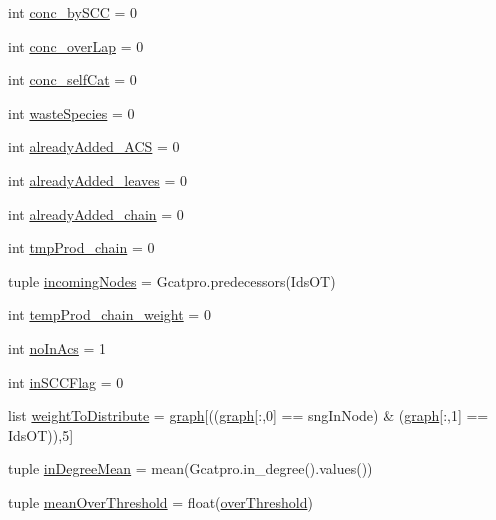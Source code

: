 \begin{DoxyCompactItemize}
int \hyperlink{a00102_aac2f508d526d62bd7f9d4f5a5f8b1821}{conc\-\_\-by\-S\-C\-C} = 0
\item 
int \hyperlink{a00102_afd3169174539244248b78c8da2bba265}{conc\-\_\-over\-Lap} = 0
\item 
int \hyperlink{a00102_a9e8cc07f7d7f892f3f72274318dcbcef}{conc\-\_\-self\-Cat} = 0
\item 
int \hyperlink{a00102_ace0de61f3c6aa14b4197156be3a68280}{waste\-Species} = 0
\item 
int \hyperlink{a00102_a38f20e6b1cad6a61f1c9b87b37c76f63}{already\-Added\-\_\-\-A\-C\-S} = 0
\item 
int \hyperlink{a00102_ac842390795cf193351c795945cde8e77}{already\-Added\-\_\-leaves} = 0
\item 
int \hyperlink{a00102_ac1b286545469555eb284f9b5f2bd984f}{already\-Added\-\_\-chain} = 0
\item 
int \hyperlink{a00102_aee6b4f50387d471b70458cf703c0863b}{tmp\-Prod\-\_\-chain} = 0
\item 
tuple \hyperlink{a00102_a540ba5319ee67d8a2323099dad73ba36}{incoming\-Nodes} = Gcatpro.\-predecessors(Ids\-O\-T)
\item 
int \hyperlink{a00102_aaf17c99825e0961e4cfaa173ddfffe84}{temp\-Prod\-\_\-chain\-\_\-weight} = 0
\item 
int \hyperlink{a00102_a4766b3ca835449f1aa287fda699c7f96}{no\-In\-Acs} = 1
\item 
int \hyperlink{a00102_a6405b6b05e7b87812422cc30d2034904}{in\-S\-C\-C\-Flag} = 0
\item 
list \hyperlink{a00102_a5162bfbe5eb2618736d1f77bb3125a9b}{weight\-To\-Distribute} = \hyperlink{a00102_ab45392da38059bf7557c22cbc73e5580}{graph}\mbox{[}((\hyperlink{a00102_ab45392da38059bf7557c22cbc73e5580}{graph}\mbox{[}\-:,0\mbox{]} == sng\-In\-Node) \& (\hyperlink{a00102_ab45392da38059bf7557c22cbc73e5580}{graph}\mbox{[}\-:,1\mbox{]} == Ids\-O\-T)),5\mbox{]}
\item 
tuple \hyperlink{a00102_a5004d18b8cfa2803620a9cd7f32d9775}{in\-Degree\-Mean} = mean(Gcatpro.\-in\-\_\-degree().values())
\item 
tuple \hyperlink{a00102_af10c3623be709892f4bdc4df5a3d52b0}{mean\-Over\-Threshold} = float(\hyperlink{a00102_a12e61f8d7aadb52256a7728af342bae3}{over\-Threshold})
\end{DoxyCompactItemize}


